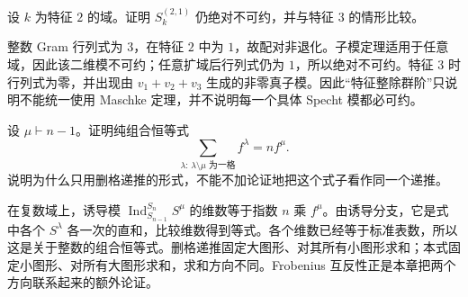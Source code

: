 \begin{exercise}\label{b5:ex:06-s3-char-two}
	设 \(k\) 为特征 \(2\) 的域。证明 \(S_k^{(2,1)}\) 仍绝对不可约，并与特征 \(3\) 的情形比较。
\end{exercise}
\begin{solution}
	整数 Gram 行列式为 \(3\)，在特征 \(2\) 中为 \(1\)，故配对非退化。子模定理适用于任意域，因此该二维模不可约；任意扩域后行列式仍为 \(1\)，所以绝对不可约。特征 \(3\) 时行列式为零，并出现由 \(v_1+v_2+v_3\) 生成的非零真子模。因此“特征整除群阶”只说明不能统一使用 Maschke 定理，并不说明每一个具体 Specht 模都必可约。
\end{solution}

\begin{exercise}\label{b5:ex:06-add-box-dimensions}
	设 \(\mu\vdash n-1\)。证明纯组合恒等式
	\[
		\sum_{\lambda:\,\lambda\setminus\mu\text{ 为一格}} f^\lambda=n f^\mu.
	\]
	说明为什么只用删格递推的形式，不能不加论证地把这个式子看作同一个递推。
\end{exercise}
\begin{solution}
	在复数域上，诱导模 \(\operatorname{Ind}_{S_{n-1}}^{S_n}S^\mu\) 的维数等于指数 \(n\) 乘 \(f^\mu\)。由诱导分支，它是式中各个 \(S^\lambda\) 各一次的直和，比较维数得到等式。各个维数已经等于标准表数，所以这是关于整数的组合恒等式。删格递推固定大图形、对其所有小图形求和；本式固定小图形、对所有大图形求和，求和方向不同。Frobenius 互反性正是本章把两个方向联系起来的额外论证。
\end{solution}
